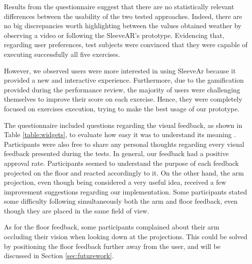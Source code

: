Results from the questionnaire suggest that there are no statistically relevant differences between the usability of the two tested approaches. Indeed, there are  no big discrepancies worth highlighting between the values obtained weather by observing a video or following the SleeveAR's prototype.
Evidencing that, regarding user preferences, test subjects were convinced that they were capable of executing successfully all five exercises. 

However, we observed users were more interested in using SleeveAr because it provided a new and interactive experience. 
Furthermore, due to the gamification provided during the performance review, the majority of users were challenging themselves to improve their score on each exercise. Hence, they were completely focused on exercises execution, trying to make the best usage of our prototype.

The questionnaire included questions regarding the visual feedback, as shown in Table \ref{table:widgets}, to evaluate how easy it was to understand its meaning . Participants were also free to share any personal thoughts regarding every visual feedback presented during the tests.
In general, our feedback had a positive approval rate. Participants seemed to understand the purpose of each feedback projected on the floor and reacted accordingly to it. 
On the other hand, the arm projection, even though being considered a very useful idea, received a few improvement suggestions regarding our implementation. Some participants stated some difficulty following simultaneously both the arm and floor feedback, even though they are placed in the same field of view.

As for the floor feedback, some participants complained about their arm occluding their vision when looking down at the projections. 
This could be solved by positioning the floor feedback further away from the user, and will be discussed in Section \ref{sec:futurework}.

\begin{table}[!t]
\centering
{}
\caption{Widgets Questionnaire}
\label{table:widgets}
\end{table}


